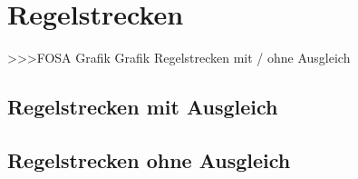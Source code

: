 \section{Regelstrecken}
>>>FOSA Grafik Grafik Regelstrecken mit / ohne Ausgleich

\subsection{Regelstrecken mit Ausgleich}

\subsection{Regelstrecken ohne Ausgleich}
